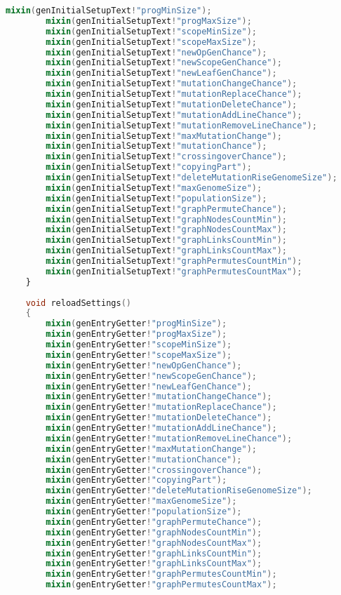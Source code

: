 \documentclass[russian,utf8,emptystyle]{eskdtext}
\begin{document}
\begin{lstlisting}[language=D]
        mixin(genInitialSetupText!"progMinSize");
        mixin(genInitialSetupText!"progMaxSize");
        mixin(genInitialSetupText!"scopeMinSize");
        mixin(genInitialSetupText!"scopeMaxSize");
        mixin(genInitialSetupText!"newOpGenChance");
        mixin(genInitialSetupText!"newScopeGenChance");
        mixin(genInitialSetupText!"newLeafGenChance");
        mixin(genInitialSetupText!"mutationChangeChance");
        mixin(genInitialSetupText!"mutationReplaceChance");
        mixin(genInitialSetupText!"mutationDeleteChance");
        mixin(genInitialSetupText!"mutationAddLineChance");
        mixin(genInitialSetupText!"mutationRemoveLineChance");
        mixin(genInitialSetupText!"maxMutationChange");
        mixin(genInitialSetupText!"mutationChance");
        mixin(genInitialSetupText!"crossingoverChance");
        mixin(genInitialSetupText!"copyingPart");
        mixin(genInitialSetupText!"deleteMutationRiseGenomeSize");
        mixin(genInitialSetupText!"maxGenomeSize");
        mixin(genInitialSetupText!"populationSize");
        mixin(genInitialSetupText!"graphPermuteChance");
        mixin(genInitialSetupText!"graphNodesCountMin");
        mixin(genInitialSetupText!"graphNodesCountMax");
        mixin(genInitialSetupText!"graphLinksCountMin");
        mixin(genInitialSetupText!"graphLinksCountMax");
        mixin(genInitialSetupText!"graphPermutesCountMin");
        mixin(genInitialSetupText!"graphPermutesCountMax");
    }
    
    void reloadSettings()
    {
        mixin(genEntryGetter!"progMinSize");
        mixin(genEntryGetter!"progMaxSize");
        mixin(genEntryGetter!"scopeMinSize");
        mixin(genEntryGetter!"scopeMaxSize");
        mixin(genEntryGetter!"newOpGenChance");
        mixin(genEntryGetter!"newScopeGenChance");
        mixin(genEntryGetter!"newLeafGenChance");
        mixin(genEntryGetter!"mutationChangeChance");
        mixin(genEntryGetter!"mutationReplaceChance");
        mixin(genEntryGetter!"mutationDeleteChance");
        mixin(genEntryGetter!"mutationAddLineChance");
        mixin(genEntryGetter!"mutationRemoveLineChance");
        mixin(genEntryGetter!"maxMutationChange");
        mixin(genEntryGetter!"mutationChance");
        mixin(genEntryGetter!"crossingoverChance");
        mixin(genEntryGetter!"copyingPart");
        mixin(genEntryGetter!"deleteMutationRiseGenomeSize");
        mixin(genEntryGetter!"maxGenomeSize");
        mixin(genEntryGetter!"populationSize");
        mixin(genEntryGetter!"graphPermuteChance");
        mixin(genEntryGetter!"graphNodesCountMin");
        mixin(genEntryGetter!"graphNodesCountMax");
        mixin(genEntryGetter!"graphLinksCountMin");
        mixin(genEntryGetter!"graphLinksCountMax");
        mixin(genEntryGetter!"graphPermutesCountMin");
        mixin(genEntryGetter!"graphPermutesCountMax");
        

\end{lstlisting}
\end{document}
